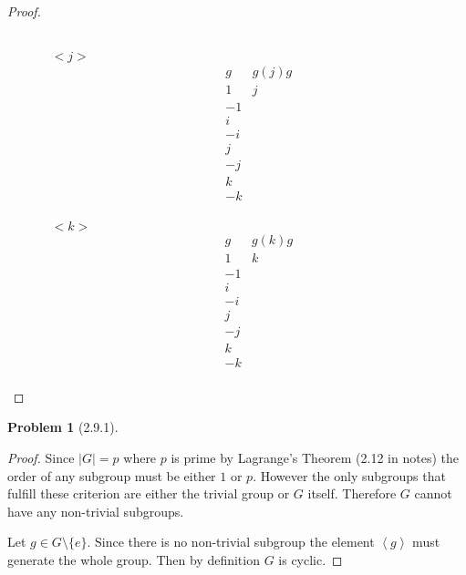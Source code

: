 \documentclass[10pt]{article}
\newcommand{\sk}{\vskip 10mm}
\theoremstyle{plain}
\newtheorem{problem}{Problem}
\theoremstyle{remark}
\begin{document}
\begin{proof}
\begin{enumerate}
\begin{itemize}
\[\begin{array}{c|c}
        \end{array}
      \]
    \item[$<j>$]
      \[
        \begin{array}{c|c}
          g & g(j)g\\
          \hline 
          1 & j\\
          -1 & \\
          i & \\
          -i & \\
          j & \\
          -j & \\
          k & \\
          -k & \\
        \end{array}
      \]
    \item[$<k>$]
      \[
        \begin{array}{c|c}
          g & g(k)g\\
          \hline 
          1 & k\\
          -1 & \\
          i & \\
          -i & \\
          j & \\
          -j & \\
          k & \\
          -k & \\
        \end{array}
      \]
    \end{itemize}
  \end{enumerate}
\end{proof}

\sk

\begin{problem}[2.9.1]
  
\end{problem}

\begin{proof}
  Since $|G|=p$ where $p$ is prime by Lagrange's Theorem (2.12 in notes)
  the order of any subgroup must be either $1$ or $p$. However the
  only subgroups that fulfill these criterion are either the trivial
  group or $G$ itself. Therefore $G$ cannot have any non-trivial subgroups.

  Let $g\in G\setminus \{e\}$. Since there is no non-trivial subgroup the element
  $\left<g\right>$ must generate the whole group. Then by definition
  $G$ is cyclic.
\end{proof}
\end{document}

